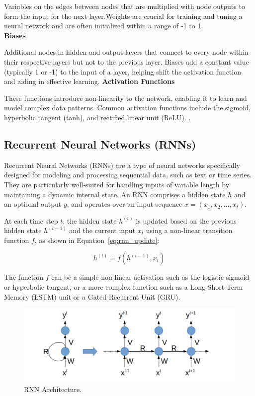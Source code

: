 Variables on the edges between nodes that are multiplied with node outputs to form the input for the next layer.Weights are crucial for training and tuning a neural network and are often initialized within a range of -1 to 1.  \\
\textbf{Biases} 


Additional nodes in hidden and output layers that connect to every node within their respective layers but not to the previous layer. Biases add a constant value (typically 1 or -1) to the input of a layer, helping shift the activation function and aiding in effective learning. 
\textbf{Activation Functions} 


These functions introduce non-linearity to the network, enabling it to learn and model complex data patterns. Common activation functions include the sigmoid, hyperbolic tangent (tanh), and rectified linear unit (ReLU). \cite{taylor2017neural}.

\subsection{ Recurrent Neural Networks (RNNs)}
Recurrent Neural Networks (RNNs) are a type of neural networks specifically designed for modeling and processing sequential data, such as text or time series. They are particularly well-suited for handling inputs of variable length by maintaining a dynamic internal state. An RNN comprises a hidden state $h$ and an optional output $y$, and operates over an input sequence $x = (x_1, x_2, \dots, x_t)$.

At each time step $t$, the hidden state $h^{(t)}$ is updated based on the previous hidden state $h^{(t-1)}$ and the current input $x_t$ using a non-linear transition function $f$, as shown in Equation~\ref{eq:rnn_update}:

\begin{equation}
	h^{(t)} = f(h^{(t-1)}, x_t)
	\label{eq:rnn_update}
\end{equation}

The function $f$ can be a simple non-linear activation such as the logistic sigmoid or hyperbolic tangent, or a more complex function such as a Long Short-Term Memory (LSTM) unit or a Gated Recurrent Unit (GRU).
\begin{figure}[htbp]
	
	\centerline{\includegraphics[width=1\linewidth]{Figures/RNN.png}}
	\caption{RNN Architecture.}
	\label{RNN.png}
\end{figure}


